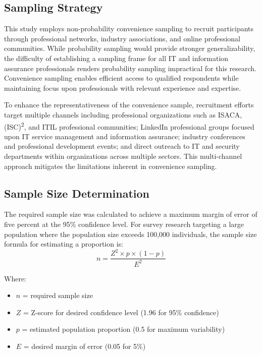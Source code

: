 \subsection{Sampling Strategy}

This study employs non-probability convenience sampling to recruit participants through professional networks, industry associations, and online professional communities. While probability sampling would provide stronger generalizability, the difficulty of establishing a sampling frame for all IT and information assurance professionals renders probability sampling impractical for this research. Convenience sampling enables efficient access to qualified respondents while maintaining focus upon professionals with relevant experience and expertise.

To enhance the representativeness of the convenience sample, recruitment efforts target multiple channels including professional organizations such as ISACA, (ISC)\textsuperscript{2}, and ITIL professional communities; LinkedIn professional groups focused upon IT service management and information assurance; industry conferences and professional development events; and direct outreach to IT and security departments within organizations across multiple sectors. This multi-channel approach mitigates the limitations inherent in convenience sampling.

\subsection{Sample Size Determination}

The required sample size was calculated to achieve a maximum margin of error of five percent at the 95\% confidence level. For survey research targeting a large population where the population size exceeds 100,000 individuals, the sample size formula for estimating a proportion is:
\clearpage
\begin{equation}
  \label{eqn:modelSizeEquation}
  n = \frac{Z^2 \times p \times (1-p)}{E^2}
\end{equation}

Where:
\begin{itemize}
  \item \(n\) = required sample size
  \item \(Z\) = Z-score for desired confidence level (1.96 for 95\% confidence)
  \item \(p\) = estimated population proportion (0.5 for maximum variability)
  \item \(E\) = desired margin of error (0.05 for 5\%)
\end{itemize}

